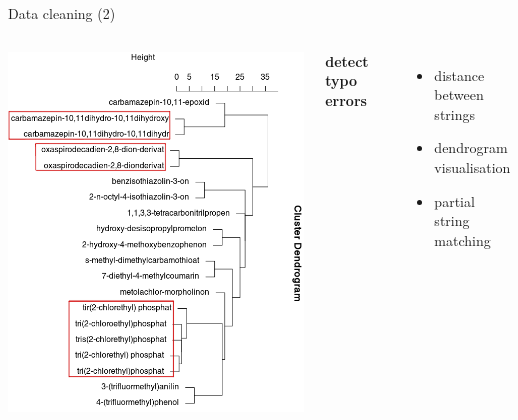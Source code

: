 \documentclass[8pt,ignorenonframetext,]{beamer}
\providecommand{\tightlist}{%
  \setlength{\itemsep}{0pt}\setlength{\parskip}{0pt}}
\newcommand{\columnsbegin}{\begin{columns}}
\newcommand{\columnsend}{\end{columns}}
\begin{document}
\begin{frame}{Data cleaning (2)}

\columnsbegin


\includegraphics{imgPres/data_cleaning_dendrogram.png}

\textbf{detect typo errors}

\begin{itemize}
\tightlist
\item
  distance between strings
\item
  dendrogram visualisation
\item
  partial string matching
\end{itemize}

\columnsend

\end{frame}
\end{document}

